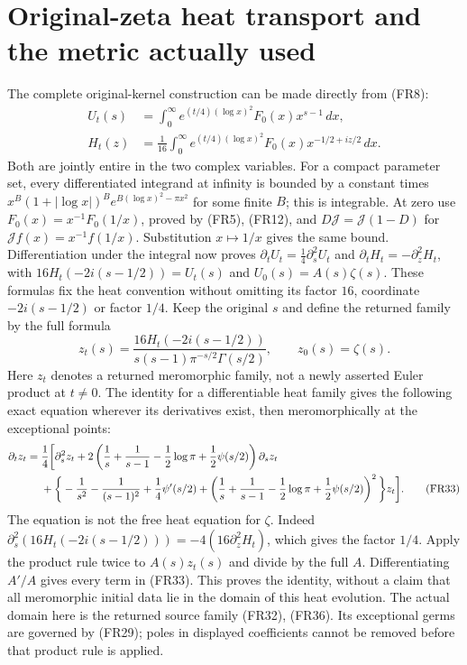 \documentclass[11pt]{article}
\begin{document}
\section{Original-zeta heat transport and the metric actually used}
The complete original-kernel construction can be made directly from (FR8):
\begin{align}
 U_t(s)&=\int_0^\infty e^{(t/4)(\log x)^2}F_0(x)x^{s-1}\,dx,\tag{FR36}\\
 H_t(z)&=\frac1{16}\int_0^\infty e^{(t/4)(\log x)^2}F_0(x)x^{-1/2+iz/2}\,dx.
 \tag{FR37}
\end{align}
Both are jointly entire in the two complex variables. For a compact parameter set, every differentiated integrand at infinity is bounded by a constant times $x^B(1+|\log x|)^B e^{B(\log x)^2-\pi x^2}$ for some finite $B$; this is integrable. At zero use $F_0(x)=x^{-1}F_0(1/x)$, proved by (FR5), (FR12), and $D\mathcal J=\mathcal J(1-D)$ for $\mathcal Jf(x)=x^{-1}f(1/x)$. Substitution $x\mapsto1/x$ gives the same bound. Differentiation under the integral now proves
$\partial_tU_t=\tfrac14\partial_s^2U_t$ and $\partial_tH_t=-\partial_z^2H_t$, with
$16H_t(-2i(s-1/2))=U_t(s)$ and $U_0(s)=A(s)\zeta(s)$.
These formulas fix the heat convention without omitting its factor $16$, coordinate $-2i(s-1/2)$ or factor $1/4$. Keep the original $s$ and define the returned family by the full formula
\begin{equation}
 z_t(s)=\frac{16H_t(-2i(s-1/2))}{s(s-1)\pi^{-s/2}\Gamma(s/2)},\qquad z_0(s)=\zeta(s).
 \tag{FR32}
\end{equation}
Here $z_t$ denotes a returned meromorphic family, not a newly asserted Euler product at $t\ne0$. The identity for a differentiable heat family gives the following exact equation wherever its derivatives exist, then meromorphically at the exceptional points:
\begin{align}
 \partial_t z_t={}&\frac14\bigg[\partial_s^2 z_t
 +2\left(\frac1s+\frac1{s-1}-\frac12\log\pi+\frac12\psi(s/2)\right)\partial_s z_t\notag\\
 &+\bigg\{-\frac1{s^2}-\frac1{(s-1)^2}+\frac14\psi'(s/2)
 +\left(\frac1s+\frac1{s-1}-\frac12\log\pi+\frac12\psi(s/2)\right)^2\bigg\}z_t\bigg].
 \tag{FR33}
\end{align}
The equation is not the free heat equation for $\zeta$. Indeed $\partial_s^2(16H_t(-2i(s-1/2)))=-4(16\partial_z^2H_t)$, which gives the factor $1/4$. Apply the product rule twice to $A(s)z_t(s)$ and divide by the full $A$. Differentiating $A'/A$ gives every term in (FR33). This proves the identity, without a claim that all meromorphic initial data lie in the domain of this heat evolution. The actual domain here is the returned source family (FR32), (FR36). Its exceptional germs are governed by (FR29); poles in displayed coefficients cannot be removed before that product rule is applied.
\end{document}
